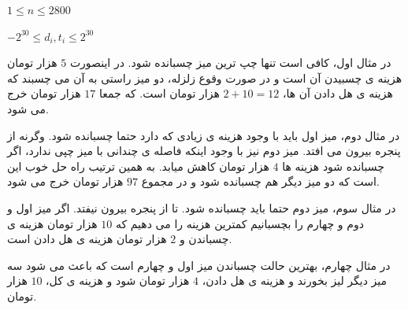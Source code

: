 \documentclass[11.5pt,a4paper,oneside]{article}
\begin{document}
\begin{problem}
\constraints
\begin{shortitems}
\item $1 \le n \leq 2800$
\item $-2^{30} \leq d_i, t_i \leq 2^{30}$
\end{shortitems}

\sampleIO

\begin{example}
%
%
%
%
\end{example}

\sampleIODescription
در مثال اول، کافی است تنها چپ ترین میز چسبانده شود. در اینصورت
$5$
هزار تومان هزینه ی چسبیدن آن است و در صورت وقوع زلزله، دو میز راستی به آن می چسبند که هزینه ی هل دادن آن ها، 
$2 + 10 = 12$ 
هزار تومان است. که جمعا
$17$
هزار تومان خرج می شود.

در مثال دوم، میز اول باید با وجود هزینه ی زیادی که دارد حتما چسبانده شود. وگرنه از پنجره بیرون می افتد.
میز دوم نیز با وجود اینکه فاصله ی چندانی با میز چپی ندارد، اگر چسبانده شود هزینه ها
$4$
هزار تومان کاهش میابد.
به همین ترتیب راه حل خوب این است که دو میز دیگر هم چسبانده شود و در مجموع
$97$
هزار تومان خرج می شود.

در مثال سوم، میز دوم حتما باید چسبانده شود. تا از پنجره بیرون نیفتد. اگر میز اول و دوم و چهارم را بچسبانیم کمترین هزینه را می دهیم که
$10$
هزار تومان هزینه ی چسباندن و
$2$
هزار تومان هزینه ی هل دادن است.

در مثال چهارم، بهترین حالت چسباندن میز  اول و چهارم است که باعث می شود سه میز دیگر لیز بخورند و هزینه ی هل دادن،
$4$
هزار تومان شود و هزینه ی کل،
$10$
هزار تومان.

\end{problem}
\end{document}
